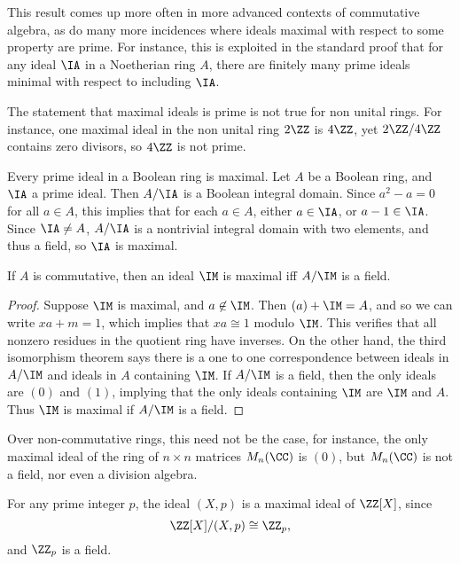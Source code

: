 This result comes up more often in more advanced contexts of commutative algebra, as do many more incidences where ideals maximal with respect to some property are prime. For instance, this is exploited in the standard proof that for any ideal $\IA$ in a Noetherian ring $A$, there are finitely many prime ideals minimal with respect to including $\IA$.

\begin{remark}
    The statement that maximal ideals is prime is not true for non unital rings. For instance, one maximal ideal in the non unital ring $2 \ZZ$ is $4\ZZ$, yet $2\ZZ / 4\ZZ$ contains zero divisors, so $4\ZZ$ is not prime.
\end{remark}

\begin{example}
    Every prime ideal in a Boolean ring is maximal. Let $A$ be a Boolean ring, and $\IA$ a prime ideal. Then $A/\IA$ is a Boolean integral domain. Since $a^2 - a = 0$ for all $a \in A$, this implies that for each $a \in A$, either $a \in \IA$, or $a - 1 \in \IA$. Since $\IA \neq A$, $A/\IA$ is a nontrivial integral domain with two elements, and thus a field, so $\IA$ is maximal.
\end{example}

\begin{theorem}
    If $A$ is commutative, then an ideal $\IM$ is maximal iff $A/\IM$ is a field.
\end{theorem}
\begin{proof}
    Suppose $\IM$ is maximal, and $a \not \in \IM$. Then $(a) + \IM = A$, and so we can write $xa + m = 1$, which implies that $xa \cong 1$ modulo $\IM$. This verifies that all nonzero residues in the quotient ring have inverses. On the other hand, the third isomorphism theorem says there is a one to one correspondence between ideals in $A/\IM$ and ideals in $A$ containing $\IM$. If $A/\IM$ is a field, then the only ideals are $(0)$ and $(1)$, implying that the only ideals containing $\IM$ are $\IM$ and $A$. Thus $\IM$ is maximal if $A/\IM$ is a field.
\end{proof}

Over non-commutative rings, this need not be the case, for instance, the only maximal ideal of the ring of $n \times n$ matrices $M_n(\CC)$ is $(0)$, but $M_n(\CC)$ is not a field, nor even a division algebra.

\begin{example}
    For any prime integer $p$, the ideal $(X,p)$ is a maximal ideal of $\ZZ[X]$, since
    \[ \ZZ[X]/(X,p) \cong \ZZ_p, \]
    and $\ZZ_p$ is a field.
\end{example}

